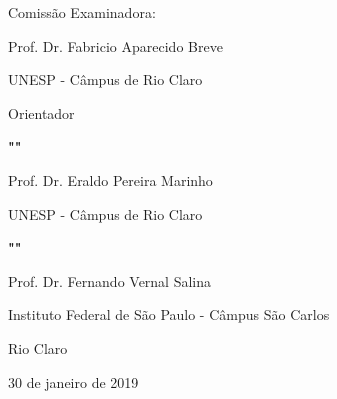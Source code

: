 %
% 
%
\begin{folhadeaprovacao}

  \begin{center}
    {\ABNTEXchapterfont\large\imprimirautor}

    \vspace*{\fill}\vspace*{\fill}
    \begin{center}
      \ABNTEXchapterfont\bfseries\Large\imprimirtitulo
    \end{center}
    \vspace*{\fill}
    
    \hspace{.45\textwidth}
    \begin{minipage}{.5\textwidth}
        \imprimirpreambulo
    \end{minipage}%
    \vspace*{\fill}
   \end{center}

  \begin{center}
  Comissão Examinadora:   
  \end{center}        
   
   
   Prof. Dr. Fabricio Aparecido Breve
   
   UNESP - Câmpus de Rio Claro
   
   Orientador
   
   \textbf{""}
   
   Prof. Dr. Eraldo Pereira Marinho
   
   UNESP - Câmpus de Rio Claro
   
   \textbf{""}
   
   Prof. Dr. Fernando Vernal Salina 
   
   Instituto Federal de São Paulo - Câmpus São Carlos
   
   
      
   \begin{center}
    \vspace*{0.5cm}
    {Rio Claro}
    \par
    {30 de janeiro de 2019}
    \vspace*{1cm}
  \end{center}
  
\end{folhadeaprovacao}
